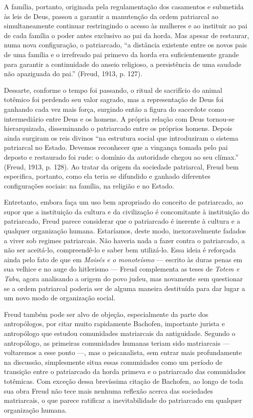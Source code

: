 A família, portanto, originada pela regulamentação dos casamentos e
submetida às leis de Deus, passou a garantir a manutenção da ordem
patriarcal ao simultaneamente continuar restringindo o acesso às
mulheres e ao instituir ao pai de cada família o poder antes exclusivo
ao pai da horda. Mas apesar de restaurar, numa nova configuração, o
patriarcado, ``a distância existente entre os novos pais de uma família
e o irrefreado pai primevo da horda era suficientemente grande para
garantir a continuidade do anseio religioso, a persistência de uma
saudade não apaziguada do pai.'' (Freud, 1913, p. 127).

Dessarte, conforme o tempo foi passando, o ritual de sacrifício do
animal totêmico foi perdendo seu valor sagrado, mas a representação de
Deus foi ganhando cada vez mais força, surgindo então a figura do
sacerdote como intermediário entre Deus e os homens. A própria relação
com Deus tornou-se hierarquizada, disseminando o patriarcado entre os
próprios homens. Depois ainda surgiram os reis divinos ``na estrutura
social que introduziram o sistema patriarcal no Estado. Devemos
reconhecer que a vingança tomada pelo pai deposto e restaurado foi rude:
o domínio da autoridade chegou ao seu clímax.'' (Freud, 1913, p. 128).
Ao tratar da origem da sociedade patriarcal, Freud bem especifica,
portanto, como ela teria se difundido e ganhado diferentes configurações
sociais: na família, na religião e no Estado.

Entretanto, embora faça um uso bem apropriado do conceito de
patriarcado, ao supor que a instituição da cultura e da civilização é
concomitante à instituição do patriarcado, Freud parece considerar que o
patriarcado é inerente à cultura e a qualquer organização humana.
Estaríamos, deste modo, inexoravelmente fadados a viver sob regimes
patriarcais. Não haveria nada a fazer contra o patriarcado, a não ser
aceitá-lo, compreendê-lo e saber bem utilizá-lo. Essa ideia é reforçada
ainda pelo fato de que em \emph{Moisés e o monoteísmo} --- escrito às
duras penas em sua velhice e no auge do hitlerismo --- Freud complementa
as teses de \emph{Totem e Tabu}, agora analisando a origem do povo
judeu, mas novamente sem questionar se a ordem patriarcal poderia ser de
alguma maneira destituída para dar lugar a um novo modo de organização
social.

Freud também pode ser alvo de objeção, especialmente da parte dos
antropólogos, por citar muito rapidamente Bachofen, importante jurista e
antropólogo que estudou comunidades matriarcais da antiguidade. Segundo
o antropólogo, as primeiras comunidades humanas teriam sido matriarcais
--- voltaremos a esse ponto ---, mas o psicanalista, sem entrar mais
profundamente na discussão, simplesmente situa essas comunidades como um
período de transição entre o patriarcado da horda primeva e o
patriarcado das comunidades totêmicas. Com exceção dessa brevíssima
citação de Bachofen, ao longo de toda sua obra Freud não tece mais
nenhuma reflexão acerca das sociedades matriarcais, o que parece
ratificar a inevitabilidade do patriarcado em qualquer organização
humana.

